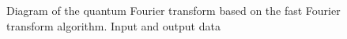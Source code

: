 \begin{figure}
\centering



\caption{Diagram of the quantum Fourier transform based on the fast Fourier transform algorithm. Input and output data}
\label{figQuantCompQuantFourier0}
\end{figure}